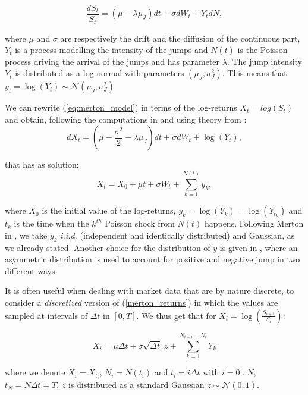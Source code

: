 \begin{equation}
\label{eq:merton_model}
\frac{dS_t}{S_t} = (\mu - \lambda \mu_J) dt + \sigma dW_t  + Y_t dN,
\end{equation}

where $\mu$ and $\sigma$ are respectively the drift and the diffusion of the continuous part, $Y_t$ is a process modelling the intensity of the jumps and $N(t)$ is the Poisson process driving the arrival of the jumps and has parameter $\lambda$.
The jump intensity $Y_t$ is distributed as a log-normal with parameters $(\mu_J, \sigma_J^2)$. This means that $ y_t = \log(Y_t) \sim \mathcal{N}(\mu_J, \sigma_J^2)$

We can rewrite (\ref{eq:merton_model}) in terms of the log-returns $X_t = log(S_t)$ and obtain, following the computations in \citep{MARTIN2007} and using theory from \citep{TANKOV2015}:
\begin{equation}
dX_t = (\mu - \frac{\sigma^2}{2} - \lambda \mu_J)dt + \sigma dW_t + \log(Y_t),
\end{equation}

that has as solution:
\begin{equation}
\label{merton_returns}
X_t =X_0 +  \mu t + \sigma W_t + \sum_{k=1}^{N(t)} y_k,
\end{equation}

where $X_0$ is the initial value of the log-returns, $y_k= \log(Y_k) = \log(Y_{t_k})$ and $t_k$ is the time when the $k^{th}$ Poisson shock from $N(t)$ happens. 
Following Merton in \citep{MERTON1976}, we take $y_k$ \textit{i.i.d.} (independent and identically distributed) and Gaussian, as we already stated.
Another choice for the distribution of $y$ is given in \citep{KOU2002}, where an asymmetric distribution is used to account for positive and negative jump in two different ways. 


It is often useful when dealing with market data that are by nature discrete, to consider a \textit{discretized} version of (\ref{merton_returns}) in which the values are sampled at intervals of $\Delta t$ in $[0, T]$. We thus get that for $X_i = \log(\frac{S_{i+1}}{S_i})$:

\begin{equation}
\label{discrete_returns}
X_i =  \mu \Delta t + \sigma \sqrt{\Delta t} \; z +  \sum_{k=1}^{N_{i+1} - N_i} Y_k
\end{equation}

where we denote $X_i = X_{t_i}$, $N_i = N(t_i)$ and $t_i = i \Delta t$ with $i= 0 \dots N$, $t_N = N \Delta t= T$,  $z$ is distributed as a standard Gaussian $ z\sim \mathcal{N}(0,1)$.


